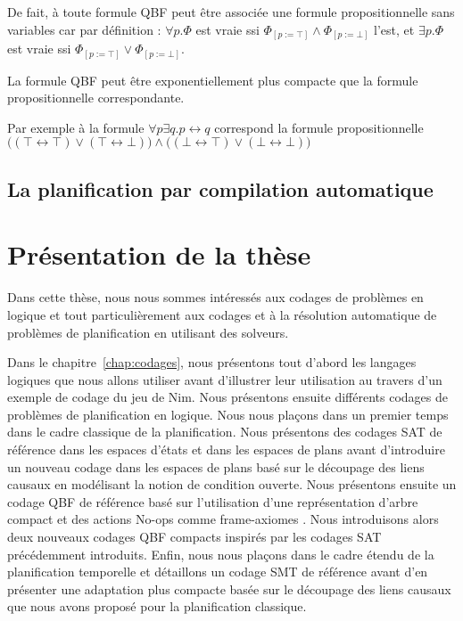 De fait, à toute formule QBF peut être associée une formule propositionnelle sans variables car par définition : 
$\forall p.\Phi$ est vraie ssi $\Phi_{[p:=\top]} \wedge \Phi_{[p:=\bot]}$ l'est, et $\exists p.\Phi$ est vraie ssi $\Phi_{[p:=\top]} \vee \Phi_{[p:=\bot]}$. 

La formule QBF peut être exponentiellement plus compacte que la formule propositionnelle correspondante. 

Par exemple à la formule $\forall p \exists q.p \leftrightarrow q$ correspond la formule propositionnelle \\
$\Big ( (\top \leftrightarrow \top)\vee (\top \leftrightarrow \bot) \Big ) \wedge \Big ( (\bot \leftrightarrow \top)\vee (\bot \leftrightarrow \bot) \Big )$

\subsection{La planification par compilation automatique}


\section{Présentation de la thèse}

Dans cette thèse, nous nous sommes intéressés aux codages de problèmes en logique et tout particulièrement aux codages et à la résolution automatique de problèmes de planification en utilisant des solveurs.


Dans le chapitre~\ref{chap:codages}, nous présentons tout d'abord les langages logiques que nous allons utiliser avant d'illustrer leur utilisation au travers d'un exemple de codage du jeu de Nim. Nous présentons ensuite différents codages de problèmes de planification en logique. Nous nous plaçons dans un premier temps dans le cadre classique de la planification. Nous présentons des codages SAT de référence dans les espaces d'états \cite{KS92,KS95} et dans les espaces de plans \cite{MK99} avant d'introduire un nouveau codage dans les espaces de plans basé sur le découpage des liens causaux en modélisant la notion de condition ouverte. Nous présentons ensuite un codage QBF de référence basé sur l'utilisation d'une représentation d'arbre compact et des actions No-ops comme frame-axiomes \cite{DBLP:conf/ecai/CashmoreFG12,DBLP:phd/ethos/Cashmore13}. Nous introduisons alors deux nouveaux codages QBF compacts inspirés par les codages SAT précédemment introduits. Enfin, nous nous plaçons dans le cadre étendu de la planification temporelle et détaillons un codage SMT de référence \cite{MarisRegnier08} avant d'en présenter une adaptation plus compacte basée sur le découpage des liens causaux que nous avons proposé pour la planification classique.

